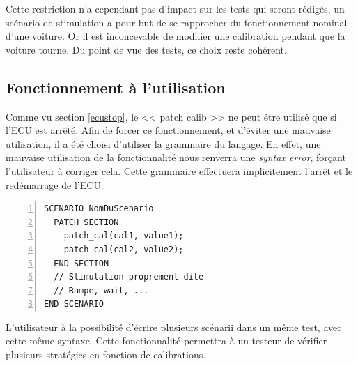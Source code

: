 		Cette restriction n'a cependant pas d'impact sur les tests qui seront rédigés, un scénario de stimulation a pour but de se rapprocher du fonctionnement nominal d'une voiture. Or il est inconcevable de modifier une calibration pendant que la voiture tourne. Du point de vue des tests, ce choix reste cohérent. 

\subsection{Fonctionnement à l'utilisation}\label{usePatch}
\vspace{-15px}
Comme vu section \ref{ecustop}, le << patch calib >> ne peut être utilisé que si l'ECU est arrêté. Afin de forcer ce fonctionnement, et d'éviter une mauvaise utilisation, il a été choisi d'utiliser la grammaire du langage. En effet, une mauvaise utilisation de la fonctionnalité nous renverra une \textit{syntax error}, forçant l'utilisateur à corriger cela. Cette grammaire effectuera implicitement l'arrêt et le redémarrage de l'ECU.

\begin{lstlisting}[language=gtl,numbers=left,caption=Scénario de stimulation contenant des patchs de calibration]
SCENARIO NomDuScenario
  PATCH SECTION
    patch_cal(cal1, value1);
    patch_cal(cal2, value2);
  END SECTION
  // Stimulation proprement dite
  // Rampe, wait, ...
END SCENARIO
\end{lstlisting}
L'utilisateur à la possibilité d'écrire plusieurs scénarii dans un même test, avec cette même syntaxe. Cette fonctionnalité permettra à un testeur de vérifier plusieurs stratégies en fonction de calibrations.
\vspace{-30px}
